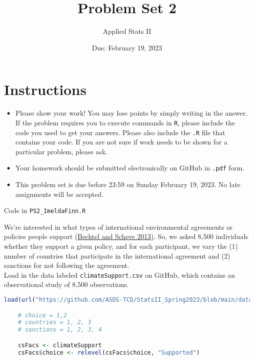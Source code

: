 \documentclass[12pt,letterpaper]{article}
\title{Problem Set 2}
\date{Due: February 19, 2023}
\author{Applied Stats II}
\begin{document}
	\maketitle
	\section*{Instructions}
	\begin{itemize}
		\item Please show your work! You may lose points by simply writing in the answer. If the problem requires you to execute commands in \texttt{R}, please include the code you used to get your answers. Please also include the \texttt{.R} file that contains your code. If you are not sure if work needs to be shown for a particular problem, please ask.
		\item Your homework should be submitted electronically on GitHub in \texttt{.pdf} form.
		\item This problem set is due before 23:59 on Sunday February 19, 2023. No late assignments will be accepted.
	\end{itemize}

	
	
	Code in \texttt{PS2\_ImeldaFinn.R}

\noindent We're interested in what types of international environmental agreements or policies people support (\href{https://www.pnas.org/content/110/34/13763}{Bechtel and Scheve 2013)}. So, we asked 8,500 individuals whether they support a given policy, and for each participant, we vary the (1) number of countries that participate in the international agreement and (2) sanctions for not following the agreement. \\

\noindent Load in the data labeled \texttt{climateSupport.csv} on GitHub, which contains an observational study of 8,500 observations.

  \begin{lstlisting}[language=R]
    load(url("https://github.com/ASDS-TCD/StatsII_Spring2023/blob/main/datasets/climateSupport.RData?raw=true"))

    # choice = 1,2
    # countries = 1, 2, 3
    # sanctions = 1, 2, 3, 4

    csFacs <- climateSupport
    csFacs$choice <- relevel(csFacs$choice, "Supported")
  \end{lstlisting}
\end{document}
